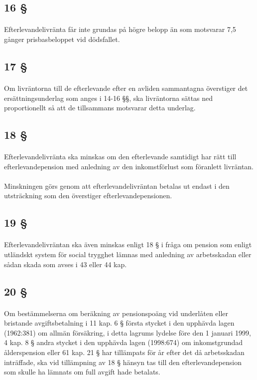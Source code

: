 \documentclass[a4paper,notitlepage,openany,10pt]{book}
\begin{document}
\subsection*{16 §}
\paragraph*{}
Efterlevandelivränta får inte grundas på högre belopp än som motsvarar 7,5 gånger prisbasbeloppet vid dödsfallet.
\subsection*{17 §}
\paragraph*{}
Om livräntorna till de efterlevande efter en avliden sammantagna överstiger det ersättningsunderlag som anges i 14-16 §§, ska livräntorna sättas ned proportionellt så att de tillsammans motsvarar detta underlag.
\subsection*{18 §}
\paragraph*{}
Efterlevandelivränta ska minskas om den efterlevande samtidigt har rätt till efterlevandepension med anledning av den inkomstförlust som föranlett livräntan.
\paragraph*{}
Minskningen görs genom att efterlevandelivräntan betalas ut endast i den utsträckning som den överstiger efterlevandepensionen.
\subsection*{19 §}
\paragraph*{}
Efterlevandelivräntan ska även minskas enligt 18 § i fråga om pension som enligt utländskt system för social trygghet lämnas med anledning av arbetsskadan eller sådan skada som avses i 43 eller 44 kap.
\subsection*{20 §}
\paragraph*{}
Om bestämmelserna om beräkning av pensionspoäng vid underlåten eller bristande avgiftsbetalning i 11 kap. 6 § första stycket i den upphävda lagen (1962:381) om allmän försäkring, i detta lagrums lydelse före den 1 januari 1999, 4 kap. 8 § andra stycket i den upphävda lagen (1998:674) om inkomstgrundad ålderspension eller 61 kap. 21 § har tillämpats för år efter det då arbetsskadan inträffade, ska vid tillämpning av 18 § hänsyn tas till den efterlevandepension som skulle ha lämnats om full avgift hade betalats.
\end{document}
